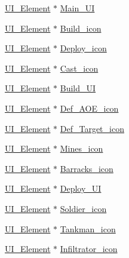 \begin{DoxyCompactItemize}
\item 
\mbox{\hyperlink{class_u_i___element}{U\+I\+\_\+\+Element}} $\ast$ \mbox{\hyperlink{class_player_ada6b724556a16c66053cca0ec592a837}{Main\+\_\+\+UI}}
\item 
\mbox{\hyperlink{class_u_i___element}{U\+I\+\_\+\+Element}} $\ast$ \mbox{\hyperlink{class_player_a516e87268fc1dc66d25c12925f50cc14}{Build\+\_\+icon}}
\item 
\mbox{\hyperlink{class_u_i___element}{U\+I\+\_\+\+Element}} $\ast$ \mbox{\hyperlink{class_player_a9cb536e84eeb0aa65d9166460c783659}{Deploy\+\_\+icon}}
\item 
\mbox{\hyperlink{class_u_i___element}{U\+I\+\_\+\+Element}} $\ast$ \mbox{\hyperlink{class_player_a6ff56e52e87b0fc6db1e802e6dd33580}{Cast\+\_\+icon}}
\item 
\mbox{\hyperlink{class_u_i___element}{U\+I\+\_\+\+Element}} $\ast$ \mbox{\hyperlink{class_player_ade6ba1f2e0318858c6ba37df88e407c6}{Build\+\_\+\+UI}}
\item 
\mbox{\hyperlink{class_u_i___element}{U\+I\+\_\+\+Element}} $\ast$ \mbox{\hyperlink{class_player_a4de3e85fdcae7a324f504a603ed37c2f}{Def\+\_\+\+A\+O\+E\+\_\+icon}}
\item 
\mbox{\hyperlink{class_u_i___element}{U\+I\+\_\+\+Element}} $\ast$ \mbox{\hyperlink{class_player_a187041a31a299c3b21a66f933d7b0298}{Def\+\_\+\+Target\+\_\+icon}}
\item 
\mbox{\hyperlink{class_u_i___element}{U\+I\+\_\+\+Element}} $\ast$ \mbox{\hyperlink{class_player_a50174d01e6d4aecea84a2a795e660517}{Mines\+\_\+icon}}
\item 
\mbox{\hyperlink{class_u_i___element}{U\+I\+\_\+\+Element}} $\ast$ \mbox{\hyperlink{class_player_a9af46b03c4d13ce71174c19882d668ff}{Barracks\+\_\+icon}}
\item 
\mbox{\hyperlink{class_u_i___element}{U\+I\+\_\+\+Element}} $\ast$ \mbox{\hyperlink{class_player_aadaf2cbef1851be0c84e6f34fc4db253}{Deploy\+\_\+\+UI}}
\item 
\mbox{\hyperlink{class_u_i___element}{U\+I\+\_\+\+Element}} $\ast$ \mbox{\hyperlink{class_player_abb51b9657cede554e090b1ca8aef5933}{Soldier\+\_\+icon}}
\item 
\mbox{\hyperlink{class_u_i___element}{U\+I\+\_\+\+Element}} $\ast$ \mbox{\hyperlink{class_player_aca20327e291a4a6d68bce39546585215}{Tankman\+\_\+icon}}
\item 
\mbox{\hyperlink{class_u_i___element}{U\+I\+\_\+\+Element}} $\ast$ \mbox{\hyperlink{class_player_a5dfc5406b2207136c0cba5dc4ab7e130}{Infiltrator\+\_\+icon}}
\item 

\end{DoxyCompactItemize}
